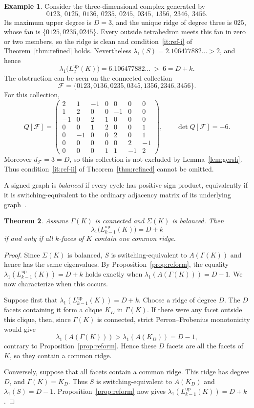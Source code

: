 \documentclass[11pt,reqno]{amsart}
\numberwithin{equation}{section}
\theoremstyle{plain}
\newtheorem{theorem}{Theorem}[section]
\theoremstyle{definition}
\newtheorem{example}[theorem]{Example}
\newcommand{\Lup}{L^{\mathrm{up}}}
\newcommand{\Fset}{\mathcal F}
\begin{document}
\begin{example}\label{ex:dim3}
Consider the three-dimensional complex generated by
\[
  0123,\ 0125,\ 0136,\ 0235,\ 0245,\ 0345,\ 1356,\ 2346,\ 3456 .
\]
Its maximum upper degree is $D=3$, and the unique ridge of degree three is $025$, whose fan is
$\{0125,0235,0245\}$. Every outside tetrahedron meets this fan in zero or two members, so the
ridge is clean and condition~\ref{it:ref-i} of Theorem~\ref{thm:refined} holds. Nevertheless
$\lambda_1(S)=2.106477882\ldots>2$, and hence
\[
  \lambda_1\bigl(\Lup_2(K)\bigr)=6.106477882\ldots\ >\ 6=D+k .
\]
The obstruction can be seen on the connected collection
\[
  \Fset=\{0123,0136,0235,0345,1356,2346,3456\}.
\]
For this collection,
\[
  Q[\Fset]=
  \begin{pmatrix}
    2&1&-1&0&0&0&0\\
    1&2&0&0&-1&0&0\\
    -1&0&2&1&0&0&0\\
    0&0&1&2&0&0&1\\
    0&-1&0&0&2&0&1\\
    0&0&0&0&0&2&-1\\
    0&0&0&1&1&-1&2
  \end{pmatrix},
  \qquad \det Q[\Fset]=-6 .
\]
Moreover $d_{\Fset}=3=D$, so this collection is not excluded by
Lemma~\ref{lem:gersh}. Thus condition~\ref{it:ref-ii} of Theorem~\ref{thm:refined} cannot be
omitted.
\end{example}

A signed graph is \emph{balanced} if every cycle has positive sign product, equivalently if it is
switching-equivalent to the ordinary adjacency matrix of its underlying graph~\cite{Zaslavsky}.

\begin{theorem}\label{thm:balanced}
Assume $\Gamma(K)$ is connected and $\Sigma(K)$ is balanced. Then
\[
  \lambda_1\bigl(\Lup_{k-1}(K)\bigr)=D+k
\]
if and only if all $k$-faces of $K$ contain one common ridge.
\end{theorem}

\begin{proof}
Since $\Sigma(K)$ is balanced, $S$ is switching-equivalent to $A(\Gamma(K))$ and hence has the
same eigenvalues. By Proposition~\ref{prop:reform}, the equality
$\lambda_1(\Lup_{k-1}(K))=D+k$ holds exactly when
$\lambda_1(A(\Gamma(K)))=D-1$. We now characterize when this occurs.

Suppose first that $\lambda_1(\Lup_{k-1}(K))=D+k$. Choose a ridge of degree $D$.
The $D$ facets containing it form a clique $K_D$ in $\Gamma(K)$. If there were any facet outside
this clique, then, since $\Gamma(K)$ is connected, strict Perron--Frobenius monotonicity would
give
\[
  \lambda_1(A(\Gamma(K)))>\lambda_1(A(K_D))=D-1,
\]
contrary to Proposition~\ref{prop:reform}. Hence these $D$ facets are all the facets of $K$, so
they contain a common ridge.

Conversely, suppose that all facets contain a common ridge. This ridge has degree $D$, and
$\Gamma(K)=K_D$. Thus $S$ is switching-equivalent to $A(K_D)$ and
$\lambda_1(S)=D-1$. Proposition~\ref{prop:reform} now gives
$\lambda_1(\Lup_{k-1}(K))=D+k$.
\end{proof}
\end{document}
